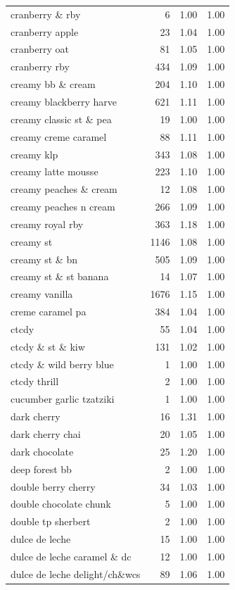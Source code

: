 \begin{table}
\begin{tabular}{lrrr}
cranberry \& rby & 6 & 1.00 & 1.00 \\
cranberry apple & 23 & 1.04 & 1.00 \\
cranberry oat & 81 & 1.05 & 1.00 \\
cranberry rby & 434 & 1.09 & 1.00 \\
creamy bb \& cream & 204 & 1.10 & 1.00 \\
creamy blackberry harve & 621 & 1.11 & 1.00 \\
creamy classic st \& pea & 19 & 1.00 & 1.00 \\
creamy creme caramel & 88 & 1.11 & 1.00 \\
creamy klp & 343 & 1.08 & 1.00 \\
creamy latte mousse & 223 & 1.10 & 1.00 \\
creamy peaches \& cream & 12 & 1.08 & 1.00 \\
creamy peaches n cream & 266 & 1.09 & 1.00 \\
creamy royal rby & 363 & 1.18 & 1.00 \\
creamy st & 1146 & 1.08 & 1.00 \\
creamy st \& bn & 505 & 1.09 & 1.00 \\
creamy st \& st banana & 14 & 1.07 & 1.00 \\
creamy vanilla & 1676 & 1.15 & 1.00 \\
creme caramel pa & 384 & 1.04 & 1.00 \\
ctcdy & 55 & 1.04 & 1.00 \\
ctcdy \& st \& kiw & 131 & 1.02 & 1.00 \\
ctcdy \& wild berry blue & 1 & 1.00 & 1.00 \\
ctcdy thrill & 2 & 1.00 & 1.00 \\
cucumber garlic tzatziki & 1 & 1.00 & 1.00 \\
dark cherry & 16 & 1.31 & 1.00 \\
dark cherry chai & 20 & 1.05 & 1.00 \\
dark chocolate & 25 & 1.20 & 1.00 \\
deep forest bb & 2 & 1.00 & 1.00 \\
double berry cherry & 34 & 1.03 & 1.00 \\
double chocolate chunk & 5 & 1.00 & 1.00 \\
double tp sherbert & 2 & 1.00 & 1.00 \\
dulce de leche & 15 & 1.00 & 1.00 \\
dulce de leche caramel \& dc & 12 & 1.00 & 1.00 \\
dulce de leche delight/ch\&wcs & 89 & 1.06 & 1.00 \\

\end{tabular}
\end{table}
